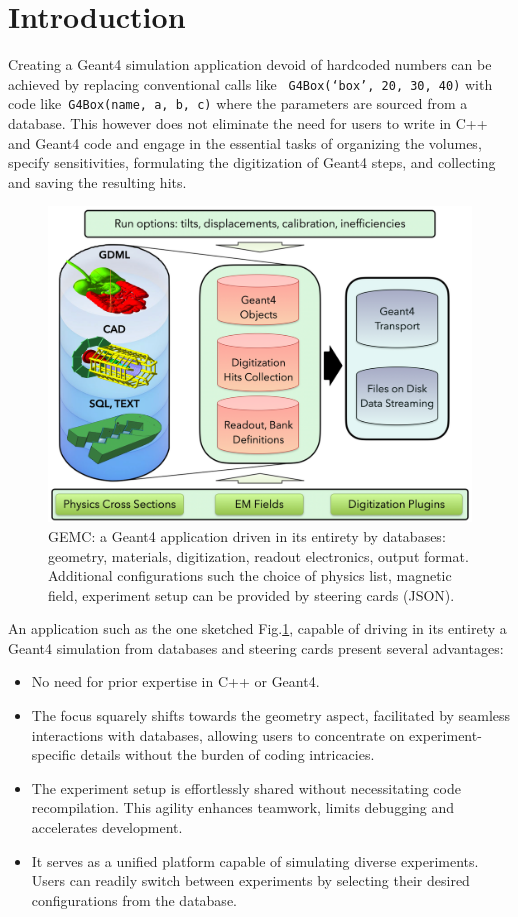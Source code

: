 \section{Introduction}
\label{sec:intro}

Creating a Geant4 simulation application devoid of hardcoded numbers can be achieved
by replacing conventional calls like ~\verb|G4Box(‘box’, 20, 30, 40)| with
code like~\verb|G4Box(name, a, b, c)| where the parameters are sourced from a database.
This however does not eliminate the need for users to write in C++ and Geant4 code
and engage in the essential tasks of organizing the volumes, specify sensitivities,
formulating the digitization of Geant4 steps, and collecting and saving the resulting hits.


\begin{figure}[h]
    \centering
    \includegraphics[width=.95\textwidth]{img/db}
    \caption{GEMC: a Geant4 application driven in its entirety by databases: geometry, materials,
        digitization, readout electronics, output format. Additional configurations such the choice
        of physics list, magnetic field, experiment setup can be provided by steering cards (JSON).}
    \label{fig:db}
\end{figure}

An application such as the one sketched Fig.\ref{fig:db}, capable of driving in its entirety
a Geant4 simulation from databases and steering cards present several advantages:

\begin{itemize}
    \item No need for prior expertise in C++ or Geant4.
    \item The focus squarely shifts towards
    the geometry aspect, facilitated by seamless interactions with databases,
    allowing users to concentrate on experiment-specific details without the burden of coding intricacies.
    \item The experiment setup is effortlessly shared without necessitating code recompilation.
    This agility enhances teamwork, limits debugging and accelerates development.
    \item It serves as a unified platform capable of simulating diverse experiments.
    Users can readily switch between experiments by selecting their desired configurations from the database.
\end{itemize}

